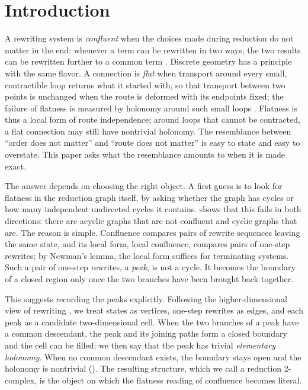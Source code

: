 \section{Introduction}
\label{sec:introduction}

A rewriting system is \emph{confluent} when the choices made during reduction do not matter in the end: whenever a term can be rewritten in two ways, the two results can be rewritten further to a common term \cite{BaaderNipkow1998,Huet1980,DershowitzJouannaud1990,Terese2003}. Discrete geometry has a principle with the same flavor. A connection is \emph{flat} when transport around every small, contractible loop returns what it started with, so that transport between two points is unchanged when the route is deformed with its endpoints fixed; the failure of flatness is measured by holonomy around such small loops \cite{Meneses2021,BaezMuniain1994}. Flatness is thus a local form of route independence; around loops that cannot be contracted, a flat connection may still have nontrivial holonomy. The resemblance between ``order does not matter'' and ``route does not matter'' is easy to state and easy to overstate. This paper asks what the resemblance amounts to when it is made exact.

The answer depends on choosing the right object. A first guess is to look for flatness in the reduction graph itself, by asking whether the graph has cycles or how many independent undirected cycles it contains.  shows that this fails in both directions: there are acyclic graphs that are not confluent and cyclic graphs that are. The reason is simple. Confluence compares pairs of rewrite sequences leaving the same state, and its local form, local confluence, compares pairs of one-step rewrites; by Newman's lemma, the local form suffices for terminating systems. Such a pair of one-step rewrites, a \emph{peak}, is not a cycle. It becomes the boundary of a closed region only once the two branches have been brought back together.

This suggests recording the peaks explicitly. Following the higher-dimensional view of rewriting \cite{Mimram2023,GuiraudMalbos2018,GuiraudMalbos2012,Squier1987}, we treat states as vertices, one-step rewrites as edges, and each peak as a candidate two-dimensional cell. When the two branches of a peak have a common descendant, the peak and its joining paths form a closed boundary and the cell can be filled; we then say that the peak has trivial \emph{elementary holonomy}. When no common descendant exists, the boundary stays open and the holonomy is nontrivial (). The resulting structure, which we call a reduction 2-complex, is the object on which the flatness reading of confluence becomes literal.

